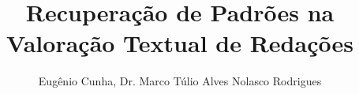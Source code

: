 \title{Recuperação de Padrões na Valoração Textual de Redações}

\author{Eugênio Cunha, Dr. Marco Túlio Alves Nolasco Rodrigues}

\address{Universidade de Itaúna (UIT)\\
  Caixa Postal 100 -- 35.680-142 -- Itaúna -- MG -- Brasil
}